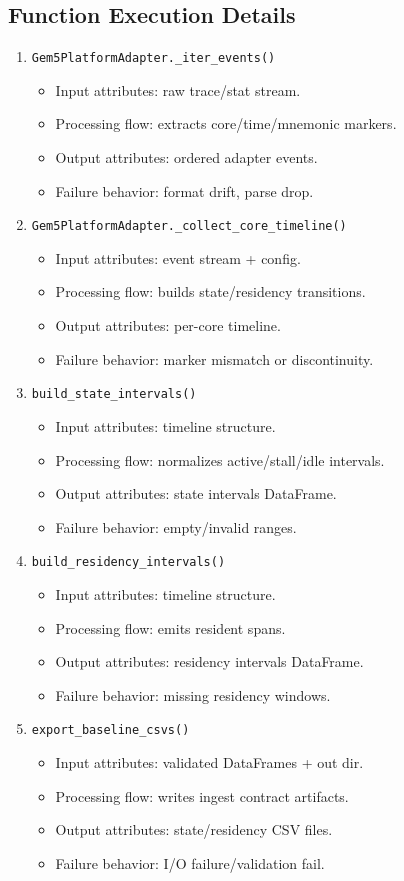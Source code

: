 \documentclass[11pt,a4paper]{article}
\begin{document}
\subsection*{Function Execution Details}
\begin{enumerate}[leftmargin=*]
  \item \texttt{Gem5PlatformAdapter.\_iter\_events()}
  \begin{itemize}[leftmargin=*]
    \item Input attributes: raw trace/stat stream.
    \item Processing flow: extracts core/time/mnemonic markers.
    \item Output attributes: ordered adapter events.
    \item Failure behavior: format drift, parse drop.
  \end{itemize}
  \item \texttt{Gem5PlatformAdapter.\_collect\_core\_timeline()}
  \begin{itemize}[leftmargin=*]
    \item Input attributes: event stream + config.
    \item Processing flow: builds state/residency transitions.
    \item Output attributes: per-core timeline.
    \item Failure behavior: marker mismatch or discontinuity.
  \end{itemize}
  \item \texttt{build\_state\_intervals()}
  \begin{itemize}[leftmargin=*]
    \item Input attributes: timeline structure.
    \item Processing flow: normalizes active/stall/idle intervals.
    \item Output attributes: state intervals DataFrame.
    \item Failure behavior: empty/invalid ranges.
  \end{itemize}
  \item \texttt{build\_residency\_intervals()}
  \begin{itemize}[leftmargin=*]
    \item Input attributes: timeline structure.
    \item Processing flow: emits resident spans.
    \item Output attributes: residency intervals DataFrame.
    \item Failure behavior: missing residency windows.
  \end{itemize}
  \item \texttt{export\_baseline\_csvs()}
  \begin{itemize}[leftmargin=*]
    \item Input attributes: validated DataFrames + out dir.
    \item Processing flow: writes ingest contract artifacts.
    \item Output attributes: state/residency CSV files.
    \item Failure behavior: I/O failure/validation fail.
  \end{itemize}
\end{enumerate}
\end{document}
